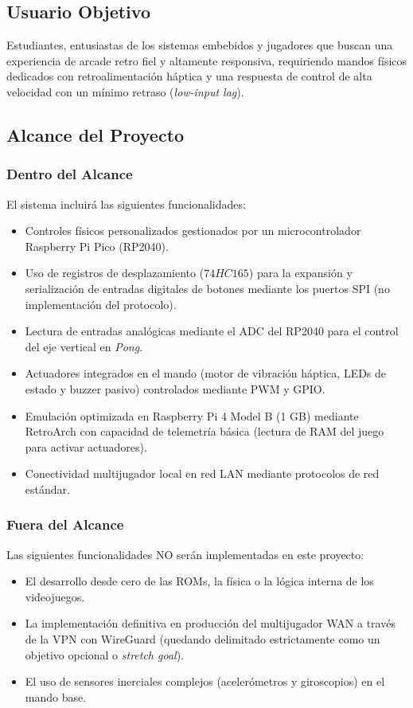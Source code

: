 \documentclass[conference]{IEEEtran}
\begin{document}
\subsection{Usuario Objetivo}

Estudiantes, entusiastas de los sistemas embebidos y jugadores que buscan una experiencia de arcade retro fiel y altamente responsiva, requiriendo mandos físicos dedicados con retroalimentación háptica y una respuesta de control de alta velocidad con un mínimo retraso (\textit{low-input lag}).

\subsection{Alcance del Proyecto}

\subsubsection{Dentro del Alcance}

El sistema incluirá las siguientes funcionalidades:
\begin{itemize}
	\item Controles físicos personalizados gestionados por un microcontrolador Raspberry Pi Pico (RP2040).
	\item Uso de registros de desplazamiento ($74HC165$) para la expansión y serialización de entradas digitales de botones mediante los puertos SPI (no implementación del protocolo).
	\item Lectura de entradas analógicas mediante el ADC del RP2040 para el control del eje vertical en \textit{Pong}.
	\item Actuadores integrados en el mando (motor de vibración háptica, LEDs de estado y buzzer pasivo) controlados mediante PWM y GPIO.
	\item Emulación optimizada en Raspberry Pi 4 Model B (1 GB) mediante RetroArch con capacidad de telemetría básica (lectura de RAM del juego para activar actuadores).
	\item Conectividad multijugador local en red LAN mediante protocolos de red estándar.
\end{itemize}

\subsubsection{Fuera del Alcance}

Las siguientes funcionalidades NO serán implementadas en este proyecto:
\begin{itemize}
	\item El desarrollo desde cero de las ROMs, la física o la lógica interna de los videojuegos.
	\item La implementación definitiva en producción del multijugador WAN a través de la VPN con WireGuard (quedando delimitado estrictamente como un objetivo opcional o \textit{stretch goal}).
	\item El uso de sensores inerciales complejos (acelerómetros y giroscopios) en el mando base.
\end{itemize}
\end{document}
